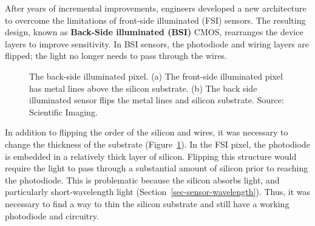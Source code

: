 \documentclass[
  letterpaper,
]{book}
\begin{document}
After years of incremental improvements, engineers developed a new
architecture to overcome the limitations of front-side illuminated (FSI)
sensors. The resulting design, known as \textbf{Back-Side illuminated
(BSI)} CMOS, rearranges the device layers to improve sensitivity. In BSI
sensors, the photodiode and wiring layers are flipped; the light no
longer needs to pass through the wires.

\begin{figure}


\caption{\label{fig-sensor-bsi2}The back-side illuminated pixel. (a) The
front-side illuminated pixel has metal lines above the silicon
substrate. (b) The back side illuminated sensor flips the metal lines
and silicon substrate. Source: Scientific Imaging.}

\end{figure}%

In addition to flipping the order of the silicon and wires, it was
necessary to change the thickness of the substrate
(Figure~\ref{fig-sensor-bsi2}). In the FSI pixel, the photodiode is
embedded in a relatively thick layer of silicon. Flipping this structure
would require the light to pass through a substantial amount of silicon
prior to reaching the photodiode. This is problematic because the
silicon absorbs light, and particularly short-wavelength light
(Section~\ref{sec-sensor-wavelength}). Thus, it was necessary to find a
way to thin the silicon substrate and still have a working photodiode
and circuitry.
\end{document}
